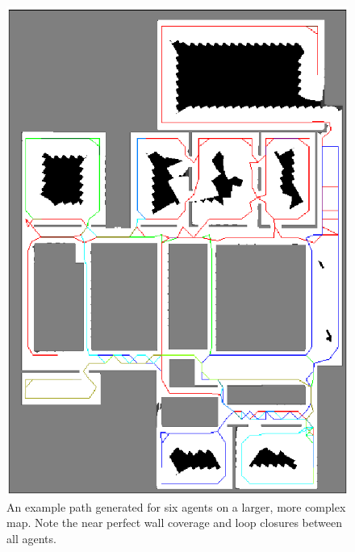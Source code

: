 \documentclass[letterpaper, 10 pt, conference]{ieeeconf}  %
\begin{document}
\begin{figure}
  \centering
  \includegraphics[width=1.0\linewidth]{figures/six_agent_path.png}
  \caption{An example path generated for six agents on a larger, more complex map. Note the near perfect wall coverage and loop closures between all agents.}
  \label{fig:six_path}
\end{figure}
\end{document}
